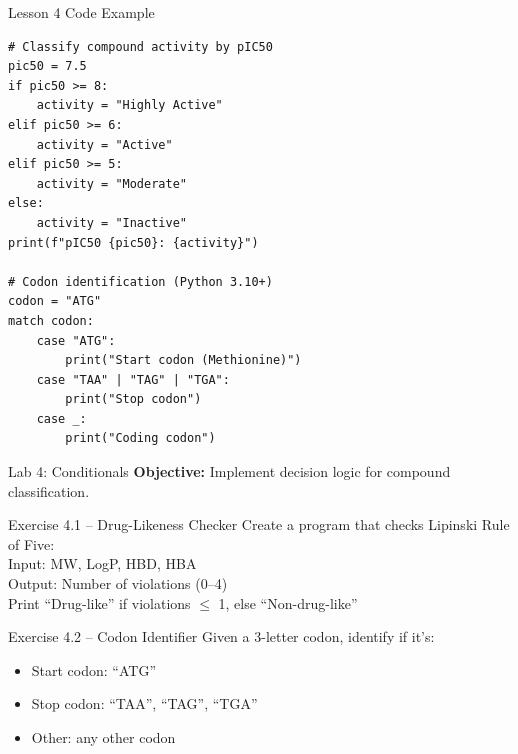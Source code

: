 \documentclass{beamer}
\begin{document}
\begin{frame}[fragile]{Lesson 4 Code Example}
    \small
    \begin{lstlisting}[style=codeStyle]
# Classify compound activity by pIC50
pic50 = 7.5
if pic50 >= 8:
    activity = "Highly Active"
elif pic50 >= 6:
    activity = "Active"
elif pic50 >= 5:
    activity = "Moderate"
else:
    activity = "Inactive"
print(f"pIC50 {pic50}: {activity}")

# Codon identification (Python 3.10+)
codon = "ATG"
match codon:
    case "ATG":
        print("Start codon (Methionine)")
    case "TAA" | "TAG" | "TGA":
        print("Stop codon")
    case _:
        print("Coding codon")
    \end{lstlisting}
\end{frame}

\begin{frame}{\textcolor{labcolor}{Lab 4: Conditionals}}
    \small
    \textbf{Objective:} Implement decision logic for compound classification.
    \vspace{0.5em}
    \begin{block}{Exercise 4.1 -- Drug-Likeness Checker}
        Create a program that checks Lipinski Rule of Five:\\
        Input: MW, LogP, HBD, HBA\\
        Output: Number of violations (0--4)\\
        Print ``Drug-like'' if violations $\leq$ 1, else ``Non-drug-like''
    \end{block}
    \vspace{0.5em}
    \begin{block}{Exercise 4.2 -- Codon Identifier}
        Given a 3-letter codon, identify if it's:
        \begin{itemize}
            \item Start codon: ``ATG''
            \item Stop codon: ``TAA'', ``TAG'', ``TGA''
            \item Other: any other codon
        \end{itemize}
    \end{block}
\end{frame}
\end{document}

